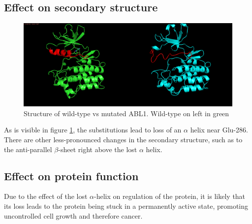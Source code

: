 \documentclass[a4paper,english]{scrreprt}
\begin{document}
\subsection{Effect on secondary structure}

\begin{figure}
	\centering
	\includegraphics[width=\linewidth]{img/abl1_structure.png}
	\caption{Structure of wild-type vs mutated ABL1. Wild-type on left in green}
	\label{fig:abl1_structure}
\end{figure}

As is visible in figure \ref{fig:abl1_structure}, the substitutions lead to
loss of an $\alpha$ helix near Glu-286. There are other less-pronounced changes
in the secondary structure, such as to the anti-parallel $\beta$-sheet right
above the lost $\alpha$ helix.

\subsection{Effect on protein function}

Due to the effect of the lost $\alpha$-helix on regulation of the
protein\cite{skriptv12}, it is likely that its loss leads to the protein being
stuck in a permanently active state, promoting uncontrolled cell growth and
therefore cancer.




\end{document}
